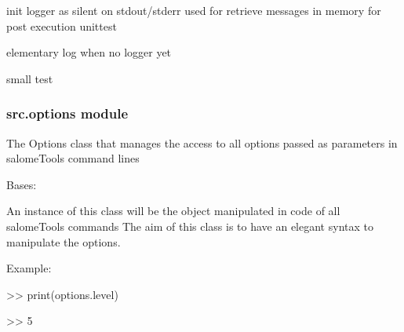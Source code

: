 \documentclass[a4paper,10pt,english]{sphinxmanual}
\begin{document}

\begin{fulllineitems}
\label{\detokenize{apidoc_src/src:src.loggingSat.initLoggerAsUnittest}}
init logger as silent on stdout/stderr
used for retrieve messages in memory for post execution unittest

\end{fulllineitems}


\begin{fulllineitems}
\label{\detokenize{apidoc_src/src:src.loggingSat.log}}
elementary log when no logger yet

\end{fulllineitems}


\begin{fulllineitems}
\label{\detokenize{apidoc_src/src:src.loggingSat.testLogger_1}}
small test

\end{fulllineitems}



\subsubsection{src.options module}
\label{\detokenize{apidoc_src/src:module-src.options}}\label{\detokenize{apidoc_src/src:src-options-module}}
The Options class that manages the access to all options passed as 
parameters in salomeTools command lines

\begin{fulllineitems}
\label{\detokenize{apidoc_src/src:src.options.OptResult}}
Bases: 

An instance of this class will be the object manipulated
in code of all salomeTools commands
The aim of this class is to have an elegant syntax to manipulate the options.

\begin{DUlineblock}{0em}
\item[] Example: 
\item[] \textgreater{}\textgreater{} print(options.level)
\item[] \textgreater{}\textgreater{} 5
\end{DUlineblock}

\end{fulllineitems}
\end{document}
